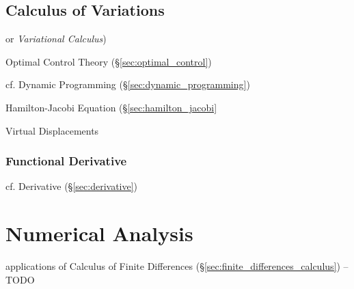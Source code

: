 \subsection{Calculus of Variations}\label{sec:calculus_of_variations}

or \emph{Variational Calculus})

\fist Optimal Control Theory (\S\ref{sec:optimal_control})

\fist cf. Dynamic Programming (\S\ref{sec:dynamic_programming})

Hamilton-Jacobi Equation (\S\ref{sec:hamilton_jacobi}

Virtual Displacements



\subsubsection{Functional Derivative}\label{sec:functional_derivative}

\fist cf. Derivative (\S\ref{sec:derivative})



\section{Numerical Analysis}\label{sec:numerical_analysis}

applications of Calculus of Finite Differences
(\S\ref{sec:finite_differences_calculus}) --TODO

